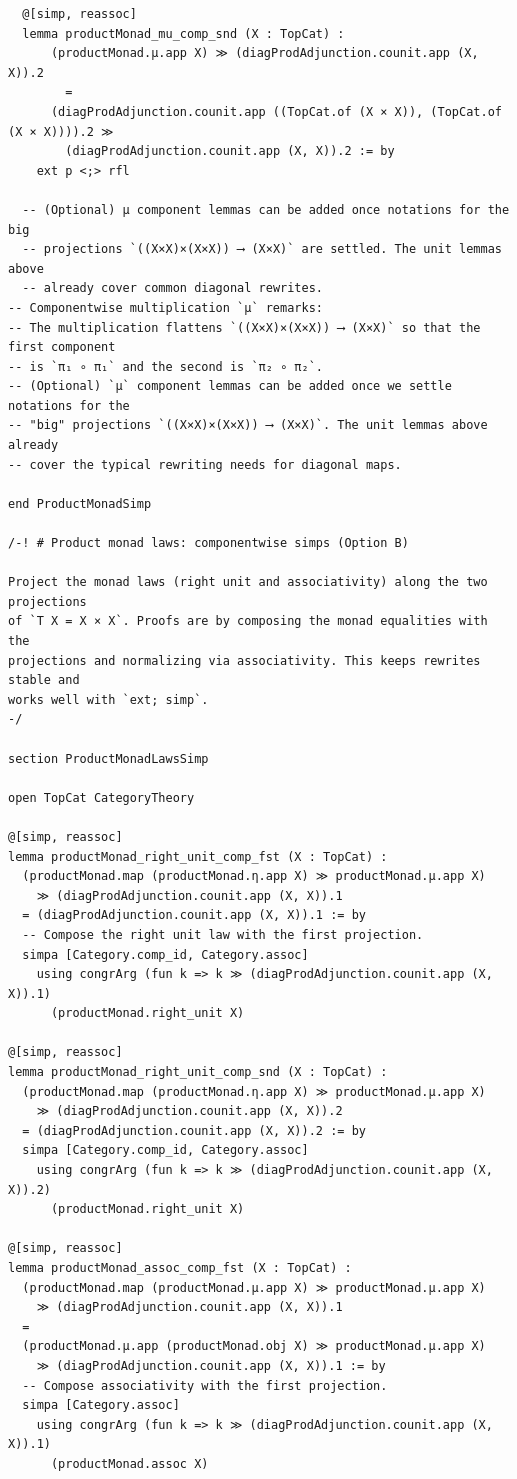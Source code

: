 \documentclass[12pt]{article}
\theoremstyle{definition}
\begin{document}
\begin{lstlisting}
  @[simp, reassoc]
  lemma productMonad_mu_comp_snd (X : TopCat) :
      (productMonad.μ.app X) ≫ (diagProdAdjunction.counit.app (X, X)).2
        =
      (diagProdAdjunction.counit.app ((TopCat.of (X × X)), (TopCat.of (X × X)))).2 ≫
        (diagProdAdjunction.counit.app (X, X)).2 := by
    ext p <;> rfl

  -- (Optional) μ component lemmas can be added once notations for the big
  -- projections `((X×X)×(X×X)) ⟶ (X×X)` are settled. The unit lemmas above
  -- already cover common diagonal rewrites.
-- Componentwise multiplication `μ` remarks:
-- The multiplication flattens `((X×X)×(X×X)) ⟶ (X×X)` so that the first component
-- is `π₁ ∘ π₁` and the second is `π₂ ∘ π₂`.
-- (Optional) `μ` component lemmas can be added once we settle notations for the
-- "big" projections `((X×X)×(X×X)) ⟶ (X×X)`. The unit lemmas above already
-- cover the typical rewriting needs for diagonal maps.

end ProductMonadSimp

/-! # Product monad laws: componentwise simps (Option B)

Project the monad laws (right unit and associativity) along the two projections
of `T X = X × X`. Proofs are by composing the monad equalities with the
projections and normalizing via associativity. This keeps rewrites stable and
works well with `ext; simp`.
-/

section ProductMonadLawsSimp

open TopCat CategoryTheory

@[simp, reassoc]
lemma productMonad_right_unit_comp_fst (X : TopCat) :
  (productMonad.map (productMonad.η.app X) ≫ productMonad.μ.app X)
    ≫ (diagProdAdjunction.counit.app (X, X)).1
  = (diagProdAdjunction.counit.app (X, X)).1 := by
  -- Compose the right unit law with the first projection.
  simpa [Category.comp_id, Category.assoc]
    using congrArg (fun k => k ≫ (diagProdAdjunction.counit.app (X, X)).1)
      (productMonad.right_unit X)

@[simp, reassoc]
lemma productMonad_right_unit_comp_snd (X : TopCat) :
  (productMonad.map (productMonad.η.app X) ≫ productMonad.μ.app X)
    ≫ (diagProdAdjunction.counit.app (X, X)).2
  = (diagProdAdjunction.counit.app (X, X)).2 := by
  simpa [Category.comp_id, Category.assoc]
    using congrArg (fun k => k ≫ (diagProdAdjunction.counit.app (X, X)).2)
      (productMonad.right_unit X)

@[simp, reassoc]
lemma productMonad_assoc_comp_fst (X : TopCat) :
  (productMonad.map (productMonad.μ.app X) ≫ productMonad.μ.app X)
    ≫ (diagProdAdjunction.counit.app (X, X)).1
  =
  (productMonad.μ.app (productMonad.obj X) ≫ productMonad.μ.app X)
    ≫ (diagProdAdjunction.counit.app (X, X)).1 := by
  -- Compose associativity with the first projection.
  simpa [Category.assoc]
    using congrArg (fun k => k ≫ (diagProdAdjunction.counit.app (X, X)).1)
      (productMonad.assoc X)


\end{lstlisting}
\end{document}
